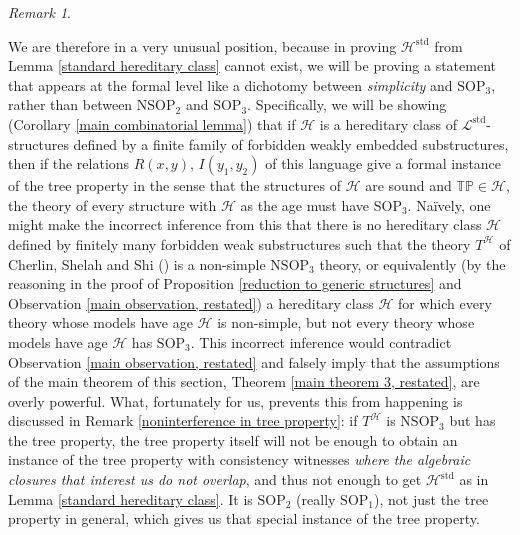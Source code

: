 \documentclass{amsart}
\theoremstyle{definition}
\theoremstyle{remark}
\newtheorem{remark}[theorem]{Remark}
\numberwithin{equation}{section}
\begin{document}
\begin{remark}
    \label{potential noninterference in SOP_2} 

    We are therefore in a very unusual position, because in proving $\mathcal{H}^{\mathrm{std}}$ from Lemma \ref{standard hereditary class} cannot exist, we will be proving a statement that appears at the formal level like a dichotomy between \textit{simplicity} and $\mathrm{SOP}_{3}$, rather than between $\mathrm{NSOP}_{2}$ and $\mathrm{SOP}_{3}$. Specifically, we will be showing (Corollary \ref{main combinatorial lemma}) that if $\mathcal{H}$ is a hereditary class of $\mathcal{L}^{\mathrm{std}}$-structures defined by a finite family of forbidden weakly embedded substructures, then if the relations $R(x, y)$, $I(y_1, y_2)$ of this language give a formal instance of the tree property in the sense that the structures of $\mathcal{H}$ are sound and $\mathbb{TP} \in \mathcal{H}$, the theory of every structure with $\mathcal{H}$ as the age must have $\mathrm{SOP}_{3}$. Naïvely, one might make the incorrect inference from this that there is no hereditary class $\mathcal{H}$ defined by finitely many forbidden weak substructures such that the theory $T^{\mathcal{H}}$ of Cherlin, Shelah and Shi (\cite{CSS99}) is a non-simple $\mathrm{NSOP}_{3}$ theory, or equivalently (by the reasoning in the proof of Proposition \ref{reduction to generic structures} and Observation \ref{main observation, restated}) a hereditary class $\mathcal{H}$ for which every theory whose models have age $\mathcal{H}$ is non-simple, but not every theory whose models have age $\mathcal{H}$ has $\mathrm{SOP}_{3}$. This incorrect inference would contradict Observation \ref{main observation, restated} and falsely imply that the assumptions of the main theorem of this section, Theorem \ref{main theorem 3, restated}, are overly powerful. What, fortunately for us, prevents this from happening is discussed in Remark \ref{noninterference in tree property}: if $T^{\mathcal{H}}$ is $\mathrm{NSOP}_{3}$ but has the tree property, the tree property itself will not be enough to obtain an instance of the tree property with consistency witnesses \textit{where the algebraic closures that interest us do not overlap}, and thus not enough to get $\mathcal{H}^{\mathrm{std}}$ as in Lemma \ref{standard hereditary class}. It is $\mathrm{SOP}_{2}$ (really $\mathrm{SOP}_{1}$), not just the tree property in general, which gives us that special instance of the tree property.


\end{remark}
\end{document}
